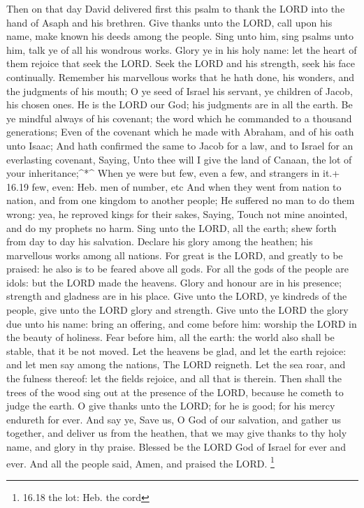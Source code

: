  Then on that day David delivered first this psalm to thank
the LORD into the hand of Asaph and his brethren.  Give
thanks unto the LORD, call upon his name, make known his deeds among the
people.  Sing unto him, sing psalms unto him, talk ye of all
his wondrous works.  Glory ye in his holy name: let the
heart of them rejoice that seek the LORD.  Seek the LORD
and his strength, seek his face continually.  Remember his
marvellous works that he hath done, his wonders, and the judgments of
his mouth;  O ye seed of Israel his servant, ye children of
Jacob, his chosen ones.  He is the LORD our God; his
judgments are in all the earth.  Be ye mindful always of
his covenant; the word which he commanded to a thousand generations;
 Even of the covenant which he made with Abraham, and of
his oath unto Isaac;  And hath confirmed the same to Jacob
for a law, and to Israel for an everlasting covenant, 
Saying, Unto thee will I give the land of Canaan, the lot of your
inheritance;\^{}*\^{}  When ye were but few, even a few,
and strangers in it.+ 16.19 few, even: Heb. men of number, etc
 And when they went from nation to nation, and from one
kingdom to another people;  He suffered no man to do them
wrong: yea, he reproved kings for their sakes,  Saying,
Touch not mine anointed, and do my prophets no harm.  Sing
unto the LORD, all the earth; shew forth from day to day his salvation.
 Declare his glory among the heathen; his marvellous works
among all nations.  For great is the LORD, and greatly to
be praised: he also is to be feared above all gods.  For
all the gods of the people are idols: but the LORD made the heavens.
 Glory and honour are in his presence; strength and
gladness are in his place.  Give unto the LORD, ye kindreds
of the people, give unto the LORD glory and strength.  Give
unto the LORD the glory due unto his name: bring an offering, and come
before him: worship the LORD in the beauty of holiness. 
Fear before him, all the earth: the world also shall be stable, that it
be not moved.  Let the heavens be glad, and let the earth
rejoice: and let men say among the nations, The LORD reigneth.
 Let the sea roar, and the fulness thereof: let the fields
rejoice, and all that is therein.  Then shall the trees of
the wood sing out at the presence of the LORD, because he cometh to
judge the earth.  O give thanks unto the LORD; for he is
good; for his mercy endureth for ever.  And say ye, Save
us, O God of our salvation, and gather us together, and deliver us from
the heathen, that we may give thanks to thy holy name, and glory in thy
praise.  Blessed be the LORD God of Israel for ever and
ever. And all the people said, Amen, and praised the LORD. \footnote{16.18
  the lot: Heb. the cord}

